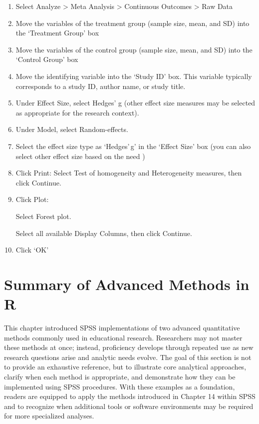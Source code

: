\documentclass[
  letterpaper,
  DIV=11,
  numbers=noendperiod]{scrreprt}
\begin{document}
\begin{enumerate}
\def\labelenumi{\arabic{enumi}.}
\item
  Select Analyze \textgreater{} Meta Analysis \textgreater{} Continuous
  Outcomes \textgreater{} Raw Data
\item
  Move the variables of the treatment group (sample size, mean, and SD)
  into the `Treatment Group' box
\item
  Move the variables of the control group (sample size, mean, and SD)
  into the `Control Group' box
\item
  Move the identifying variable into the `Study ID' box. This variable
  typically corresponds to a study ID, author name, or study title.
\item
  Under Effect Size, select Hedges' g (other effect size measures may be
  selected as appropriate for the research context).
\item
  Under Model, select Random-effects.
\item
  Select the effect size type as `Hedges'\,g' in the `Effect Size' box
  (you can also select other effect size based on the need )
\item
  Click Print: Select Test of homogeneity and Heterogeneity measures,
  then click Continue.
\item
  Click Plot:

  Select Forest plot.

  Select all available Display Columns, then click Continue.
\item
  Click `OK'\,
\end{enumerate}

\section*{Summary of Advanced Methods in
R}\label{summary-of-advanced-methods-in-r}


This chapter introduced SPSS implementations of two advanced
quantitative methods commonly used in educational research. Researchers
may not master these methods at once; instead, proficiency develops
through repeated use as new research questions arise and analytic needs
evolve. The goal of this section is not to provide an exhaustive
reference, but to illustrate core analytical approaches, clarify when
each method is appropriate, and demonstrate how they can be implemented
using SPSS procedures. With these examples as a foundation, readers are
equipped to apply the methods introduced in Chapter 14 within SPSS and
to recognize when additional tools or software environments may be
required for more specialized analyses.
\end{document}
